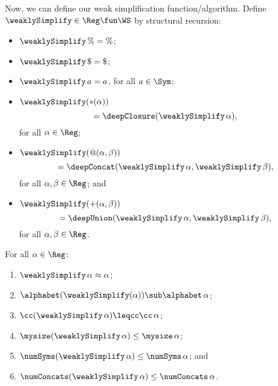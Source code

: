 Now, we can define our weak simplification function/algorithm.
Define $\weaklySimplify\in\Reg\fun\WS$ by structural recursion:
\begin{itemize}
\item $\weaklySimplify\,\% = \%$;

\item $\weaklySimplify\,\$ = \$$;

\item $\weaklySimplify\,a = a$, for all $a\in\Sym$;

\item $\weaklySimplify({*}(\alpha))$
  \begin{displaymath}
    {} = \deepClosure(\weaklySimplify\,\alpha) ,
  \end{displaymath}
  for all $\alpha\in\Reg$;

\item $\weaklySimplify(@(\alpha,\beta))$
  \begin{displaymath}
    {} = \deepConcat(\weaklySimplify\,\alpha, \weaklySimplify\,\beta) ,
  \end{displaymath}
  for all $\alpha,\beta\in\Reg$; and

\item $\weaklySimplify({+}(\alpha,\beta))$
  \begin{displaymath}
    {} = \deepUnion(\weaklySimplify\,\alpha, \weaklySimplify\,\beta) ,
  \end{displaymath}
  for all $\alpha,\beta\in\Reg$.
\end{itemize}

\begin{proposition}
\label{WeakSimpProp1}
For all $\alpha\in\Reg$:
\begin{enumerate}[\quad(1)]
\item $\weaklySimplify\,\alpha\approx\alpha$;

\item $\alphabet(\weaklySimplify(\alpha))\sub\alphabet\,\alpha$;

\item $\cc(\weaklySimplify\,\alpha)\leqcc\cc\,\alpha$;

\item $\mysize(\weaklySimplify\,\alpha)\leq\mysize\,\alpha$;

\item $\numSyms(\weaklySimplify\,\alpha)\leq\numSyms\,\alpha$; and

\item $\numConcats(\weaklySimplify\,\alpha)\leq\numConcats\,\alpha$.
\end{enumerate}
\end{proposition}


